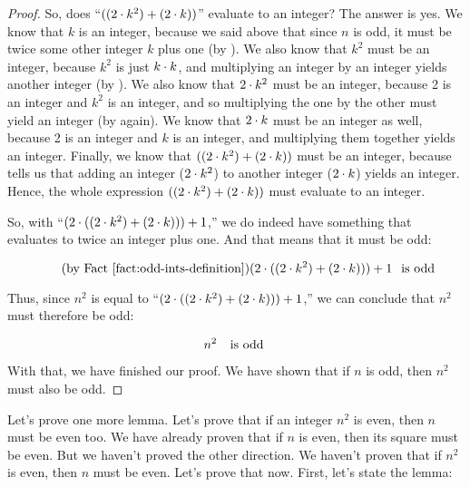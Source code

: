 \documentclass[../../../main.tex]{subfiles}
\begin{document}
\begin{proof}
So, does ``$((2 \mult/ k^{2}) + (2 \mult/ k))$'' evaluate to an integer? The answer is yes. We know that $k$ is an integer, because we said above that since $n$ is odd, it must be twice some other integer $k$ plus one (by ). We also know that $k^{2}$ must be an integer, because $k^{2}$ is just $k \mult/ k$, and multiplying an integer by an integer yields another integer (by ). We also know that $2 \mult/ k^{2}$ must be an integer, because 2 is an integer and $k^{2}$ is an integer, and so multiplying the one by the other must yield an integer (by  again). We know that $2 \mult/ k$ must be an integer as well, because 2 is an integer and $k$ is an integer, and multiplying them together yields an integer. Finally, we know that $((2 \mult/ k^{2}) + (2 \mult/ k))$ must be an integer, because  tells us that adding an integer ($2 \mult/ k^{2}$) to another integer ($2 \mult/ k$) yields an integer. Hence, the whole expression $((2 \mult/ k^{2}) + (2 \mult/ k))$ must evaluate to an integer. 

So, with ``$(2 \mult/ ((2 \mult/ k^{2}) + (2 \mult/ k))) + 1$,'' we do indeed have something that evaluates to twice an integer plus one. And that means that it must be odd:

\begin{equation*}
  \tag{by \factref{fact:odd-ints-definition}}
  (2 \mult/ ((2 \mult/ k^{2}) + (2 \mult/ k))) + 1 \hskip 0.25cm \text{is odd}
\end{equation*}

Thus, since $n^{2}$ is equal to ``$(2 \mult/ ((2 \mult/ k^{2}) + (2 \mult/ k))) + 1$,'' we can conclude that $n^{2}$ must therefore be odd:

\begin{equation*}
  n^{2} \hskip 0.25cm \text{ is odd }
\end{equation*}

With that, we have finished our proof. We have shown that if $n$ is odd, then $n^{2}$ must also be odd.

\end{proof}

Let's prove one more lemma. Let's prove that if an integer $n^{2}$ is even, then $n$ must be even too. We have already proven that if $n$ is even, then its square must be even. But we haven't proved the other direction. We haven't proven that if $n^{2}$ is even, then $n$ must be even. Let's prove that now. First, let's state the lemma:
\end{document}
